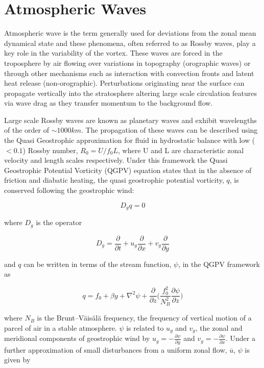 \section{Atmospheric Waves}
\label{sec:atmos_waves}
Atmospheric wave is the term generally used for deviations from the zonal mean dynamical state and these phenomena, often referred to as Rossby waves, play a key role in the variability of the vortex. These waves are forced in the troposphere by air flowing over variations in topography (orographic waves) or through other mechanisms such as interaction with convection fronts and latent heat release (non-orographic). Perturbations originating near the surface can propagate vertically into the stratosphere altering large scale circulation features via wave drag as they transfer momentum to the background flow. 

Large scale Rossby waves are known as planetary waves and exhibit wavelengths of the order of $\sim 1000km$. The propagation of these waves can be described using the Quasi Geostrophic approximation for fluid in hydrostatic balance with low ($<0.1$) Rossby number, $R_0 = U/f_0 L$, where U and L are characteristic zonal velocity and length scales respectively. Under this framework the Quasi Geostrophic Potential Vorticity (QGPV) equation states that in the absence of friction and diabatic heating, the quasi geostrophic potential vorticity, $q$, is conserved following the geostrophic wind:

\begin{equation} \label{eq-PV_conserved}
D_g q = 0
\end{equation}

\noindent where $D_g$ is the operator 

\begin{equation}\label{eq:D_g}
D_g = \frac{\partial}{\partial t} + u_g \frac{\partial}{\partial x} + v_g\frac{\partial}{\partial y} 
\end{equation}

\noindent and $q$ can be written in terms of the stream function, $\psi$, in the QGPV framework as

\begin{equation} \label{eq:QGPV}
q = f_0 + \beta y + \nabla^2 \psi + \frac{\partial}{\partial z}\bigg(\frac{f_0^2}{N_B^2} \frac{\partial \psi}{\partial z}\bigg)
\end{equation}

\noindent where $N_B$ is the Brunt–Väisälä frequency, the frequency of vertical motion of a parcel of air in a stable atmosphere. $\psi$ is related to $u_g$ and $v_g$, the zonal and meridional components of geostrophic wind by $u_g = -\frac{\partial \psi}{\partial y}$ and $v_g = -\frac{\partial \psi}{\partial x}$. Under a further approximation of small disturbances from a uniform zonal flow, $\overline{u}$, $\psi$ is given by

